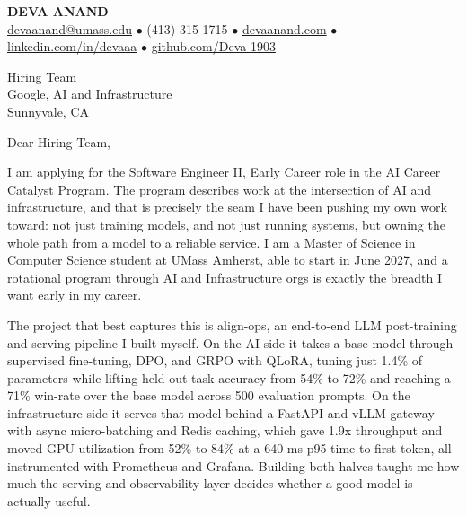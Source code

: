 \documentclass[letterpaper,11pt]{article}
\begin{document}
\begin{center}
    {\fontsize{18}{20}\selectfont\bfseries DEVA ANAND}\\ \vspace{3pt}
    {\small
    \href{mailto:devaanand@umass.edu}{devaanand@umass.edu}
    \enspace$\bullet$\enspace
    (413) 315-1715
    \enspace$\bullet$\enspace
    \href{https://devaanand.com}{devaanand.com}
    \enspace$\bullet$\enspace
    \href{https://linkedin.com/in/devaaa/}{linkedin.com/in/devaaa}
    \enspace$\bullet$\enspace
    \href{https://github.com/Deva-1903}{github.com/Deva-1903}}
\end{center}
\vspace{6pt}

\noindent Hiring Team \\
Google, AI and Infrastructure \\
Sunnyvale, CA

\vspace{2pt}

\noindent Dear Hiring Team,

I am applying for the Software Engineer II, Early Career role in the AI Career Catalyst Program. The program describes work at the intersection of AI and infrastructure, and that is precisely the seam I have been pushing my own work toward: not just training models, and not just running systems, but owning the whole path from a model to a reliable service. I am a Master of Science in Computer Science student at UMass Amherst, able to start in June 2027, and a rotational program through AI and Infrastructure orgs is exactly the breadth I want early in my career.

The project that best captures this is align-ops, an end-to-end LLM post-training and serving pipeline I built myself. On the AI side it takes a base model through supervised fine-tuning, DPO, and GRPO with QLoRA, tuning just 1.4\% of parameters while lifting held-out task accuracy from 54\% to 72\% and reaching a 71\% win-rate over the base model across 500 evaluation prompts. On the infrastructure side it serves that model behind a FastAPI and vLLM gateway with async micro-batching and Redis caching, which gave 1.9x throughput and moved GPU utilization from 52\% to 84\% at a 640 ms p95 time-to-first-token, all instrumented with Prometheus and Grafana. Building both halves taught me how much the serving and observability layer decides whether a good model is actually useful.
\end{document}
